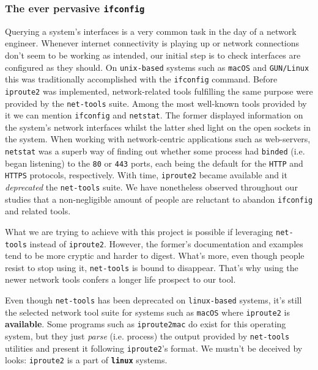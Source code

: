             \subsubsection{The ever pervasive \texttt{ifconfig}}
                Querying a system's interfaces is a very common task in the day of a network engineer. Whenever internet connectivity is playing up or network connections don't seem to be working as intended, our initial step is to check interfaces are configured as they should. On \texttt{unix-based} systems such as \texttt{macOS} and \texttt{GUN/Linux} this was traditionally accomplished with the \texttt{ifconfig} command. Before \texttt{iproute2} was implemented, network-related tools fulfilling the same purpose were provided by the \texttt{net-tools} suite. Among the most well-known tools provided by it we can mention \texttt{ifconfig} and \texttt{netstat}. The former displayed information on the system's network interfaces whilst the latter shed light on the open sockets in the system. When working with network-centric applications such as web-servers, \texttt{netstat} was a superb way of finding out whether some process had \texttt{binded} (i.e. began listening) to the \texttt{80} or \texttt{443} ports, each being the default for the \texttt{HTTP} and \texttt{HTTPS} protocols, respectively. With time, \texttt{iproute2} became available and it \textit{deprecated} the \texttt{net-tools} suite. We have nonetheless observed throughout our studies that a non-negligible amount of people are reluctant to abandon \texttt{ifconfig} and related tools.

                What we are trying to achieve with this project is possible if leveraging \texttt{net-tools} instead of \texttt{iproute2}. However, the former's documentation and examples tend to be more cryptic and harder to digest. What's more, even though people resist to stop using it, \texttt{net-tools} is bound to disappear. That's why using the newer network tools confers a longer life prospect to our tool.

                Even though \texttt{net-tools} has been deprecated on \texttt{linux-based} systems, it's still the selected network tool suite for systems such as \texttt{macOS} where \texttt{iproute2} is \textbf{available}. Some programs such as \texttt{iproute2mac} do exist for this operating system, but they just \textit{parse} (i.e. process) the output provided by \texttt{net-tools} utilities and present it following \texttt{iproute2}'s format. We mustn't be deceived by looks: \texttt{iproute2} is a part of \textbf{\texttt{linux}} systems.

